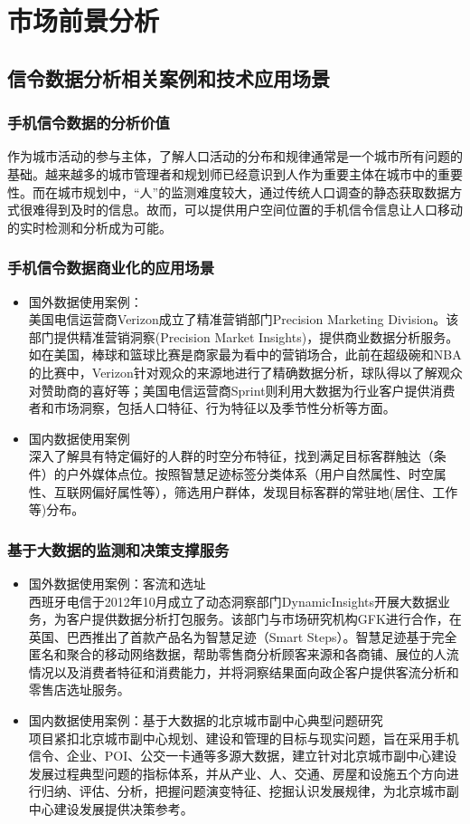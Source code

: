 \section{市场前景分析}
\subsection{信令数据分析相关案例和技术应用场景}
\subsubsection*{手机信令数据的分析价值}
作为城市活动的参与主体，了解人口活动的分布和规律通常是一个城市所有问题的基础。越来越多的城市管理者和规划师已经意识到人作为重要主体在城市中的重要性。而在城市规划中，“人”的监测难度较大，通过传统人口调查的静态获取数据方式很难得到及时的信息。故而，可以提供用户空间位置的手机信令信息让人口移动的实时检测和分析成为可能。
\subsubsection*{手机信令数据商业化的应用场景}
\begin{itemize}
	\item 国外数据使用案例：\\
	美国电信运营商Verizon成立了精准营销部门Precision Marketing Division。该部门提供精准营销洞察(Precision Market Insights)，提供商业数据分析服务。如在美国，棒球和篮球比赛是商家最为看中的营销场合，此前在超级碗和NBA的比赛中，Verizon针对观众的来源地进行了精确数据分析，球队得以了解观众对赞助商的喜好等；美国电信运营商Sprint则利用大数据为行业客户提供消费者和市场洞察，包括人口特征、行为特征以及季节性分析等方面。
	\item 国内数据使用案例 \\
	深入了解具有特定偏好的人群的时空分布特征，找到满足目标客群触达（条件）的户外媒体点位。按照智慧足迹标签分类体系（用户自然属性、时空属性、互联网偏好属性等），筛选用户群体，发现目标客群的常驻地(居住、工作等)分布。
\end{itemize}
\subsubsection*{基于大数据的监测和决策支撑服务}
\begin{itemize}
	\item  国外数据使用案例：客流和选址\\
	西班牙电信于2012年10月成立了动态洞察部门DynamicInsights开展大数据业务，为客户提供数据分析打包服务。该部门与市场研究机构GFK进行合作，在英国、巴西推出了首款产品名为智慧足迹（Smart Steps）。智慧足迹基于完全匿名和聚合的移动网络数据，帮助零售商分析顾客来源和各商铺、展位的人流情况以及消费者特征和消费能力，并将洞察结果面向政企客户提供客流分析和零售店选址服务。
	\item 国内数据使用案例：基于大数据的北京城市副中心典型问题研究\\
	项目紧扣北京城市副中心规划、建设和管理的目标与现实问题，旨在采用手机信令、企业、POI、公交一卡通等多源大数据，建立针对北京城市副中心建设发展过程典型问题的指标体系，并从产业、人、交通、房屋和设施五个方向进行归纳、评估、分析，把握问题演变特征、挖掘认识发展规律，为北京城市副中心建设发展提供决策参考。
\end{itemize}
